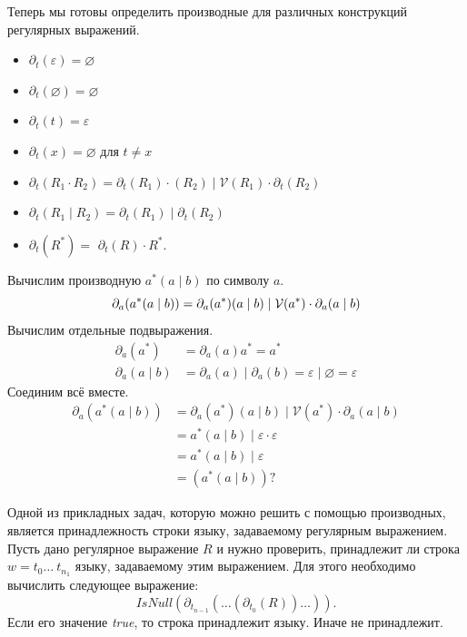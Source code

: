 Теперь мы готовы определить производные для различных конструкций регулярных выражений.
\begin{itemize}
    \item $\partial_t(\varepsilon) = \varnothing$
    \item $\partial_t(\varnothing) = \varnothing$
    \item $\partial_t(t) = \varepsilon$
    \item $\partial_t(x) = \varnothing \text{ для } t \neq x$
    \item $\partial_t(R_1 \cdot R_2) = \partial_t(R_1) \cdot (R_2) \mid \mathcal{V}(R_1) \cdot \partial_t(R_2)$
    \item $\partial_t(R_1 \mid R_2) = \partial_t(R_1) \mid \partial_t(R_2)$
    \item $\partial_t(R^*) =$ $ \partial_t(R)\cdot R^*$.
\end{itemize}

\begin{example}
    Вычислим производную $a^*(a \mid b)$ по символу $a$.
    \[
        \partial_a(a^*(a \mid b)) = \partial_a(a^*) (a \mid b) \mid \mathcal{V}(a^*) \cdot \partial_a(a \mid b) \\
    \]
    Вычислим отдельные подвыражения.
    \begin{align*}
        \partial_a(a^*) & = \partial_a(a) a^* = a^* \\
        \partial_a(a \mid b) & = \partial_a(a) \mid \partial_a(b) = \varepsilon \mid \varnothing = \varepsilon
    \end{align*}
    Соединим всё вместе.
    \begin{align*}
        \partial_a(a^*(a \mid b)) & = \partial_a(a^*) (a \mid b) \mid \mathcal{V}(a^*) \cdot \partial_a(a \mid b) \\
                                  & = a^* (a \mid b) \mid \varepsilon \cdot \varepsilon \\
                                  & = a^* (a \mid b) \mid \varepsilon \\
                                  & = (a^* (a \mid b))?
    \end{align*}
\end{example}

Одной из прикладных задач, которую можно решить с помощью производных, является принадлежность строки языку, задаваемому регулярным выражением.
Пусть дано регулярное выражение $R$ и нужно проверить, принадлежит ли строка $w=t_0 \ldots \ t_{n_1}$ языку, задаваемому этим выражением.
Для этого необходимо вычислить следующее выражение:
\[
\mathit{IsNull}(\partial_{t_{n-1}}(\ldots(\partial_{t_0}(R))\ldots)).
\]
Если его значение \emph{true}, то строка принадлежит языку.
Иначе не принадлежит.

